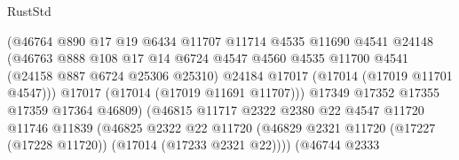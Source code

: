 \begin{lexlean}{RustStd}
\begin{coremodule}
{\begin{coremodule}
{{{{{{{{{{{{{{{{{{{{{{{{{{{{{{{{{{{{{{{{{{{{{{{{{{{{{{{                                      (@46764
                                        @890
                                        @17
                                        @19
                                        @6434
                                        @11707
                                        @11714
                                        @4535
                                        @11690
                                        @4541
                                        @24148
                                        (@46763
                                          @888
                                          @108
                                          @17
                                          @14
                                          @6724
                                          @4547
                                          @4560
                                          @4535
                                          @11700
                                          @4541
                                          (@24158 @887 @6724 @25306 @25310)
                                          @24184
                                          @17017
                                          (@17014 (@17019 @11701 @4547)))
                                        @17017
                                        (@17014 (@17019 @11691 @11707)))
                                      @17349
                                      @17352
                                      @17355
                                      @17359
                                      @17364
                                      @46809)
                                    (@46815
                                      @11717
                                      @2322
                                      @2380
                                      @22
                                      @4547
                                      @11720
                                      @11746
                                      @11839
                                      (@46825
                                        @2322
                                        @22
                                        @11720
                                        (@46829
                                          @2321
                                          @11720
                                          (@17227 (@17228 @11720))
                                          (@17014 (@17233 @2321 @22))))
                                      (@46744
                                        @2333
}}}}}}}}}}}}}}}}}}}}}}}}}}}}}}}}}}}}}}}}}}}}}}}}}}}}}}}
\end{coremodule}}
\end{coremodule}
\end{lexlean}
